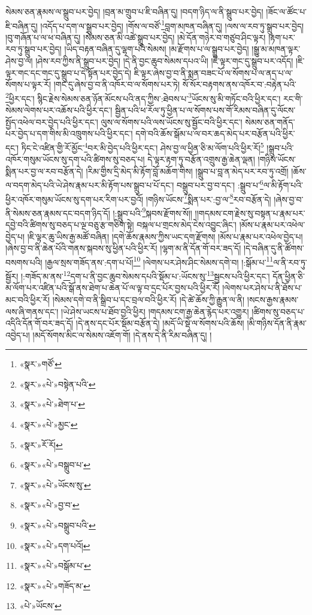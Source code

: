 སེམས་ཅན་རྣམས་ལ་སྒྲུབ་པར་བྱེད། །བྲན་མ་གྲུབ་པ་ཇི་བཞིན་དུ། །བདག་ཉིད་ལ་ནི་སྒྲུབ་པར་བྱེད། །ཟོང་ལ་ཚོང་པ་ཇི་བཞིན་དུ། །འདོད་པ་དག་ལ་སྒྲུབ་པར་བྱེད། །གོས་ལ་བཙོ་\footnote{«སྣར་»གཙོ་}བླག་མཁན་བཞིན་དུ། །ལས་ལ་རབ་ཏུ་སྒྲུབ་པར་བྱེད། །བུ་གཞོན་པ་ལ་ཕ་བཞིན་དུ། །སེམས་ཅན་མི་འཚེ་སྒྲུབ་པར་བྱེད། །མེ་དོན་གཉེར་བ་གཙུབ་ཤིང་ལྟར། །རྟག་པར་རབ་ཏུ་སྒྲུབ་པར་བྱེད། །ཡིད་བརྟན་བཞིན་དུ་ལྷག་པའི་སེམས། །མ་རྫོགས་པ་ལ་སྒྲུབ་པར་བྱེད། །སྒྱུ་མ་མཁན་ལྟར་ཤེས་བྱ་ལ། །ཤེས་རབ་ཀྱིས་ནི་སྒྲུབ་པར་བྱེད། །དེ་ནི་བྱང་ཆུབ་སེམས་དཔའ་ཡི། །ཇི་ལྟར་གང་དུ་སྒྲུབ་པར་འདོད། །ཇི་ལྟར་གང་དང་གང་དུ་སྒྲུབ་པ་དེ་སྟོན་པར་བྱེད་དེ། ཇི་ལྟར་ཞེས་བྱ་བ་ནི་སྨན་བཟང་པོ་ལ་སོགས་པ་ལ་ནད་པ་ལ་སོགས་པ་ལྟར་རོ། །གང་དུ་ཞེས་བྱ་བ་ནི་འཁོར་བ་ལ་སོགས་པར་ཏེ། སོ་སོར་བརྟགས་ནས་འཁོར་བ་:བརྟེན་པའི་\footnote{«སྣར་»«པེ་»བསྟེན་པའི་}ཕྱིར་དང་། སྙིང་རྗེས་སེམས་ཅན་ཉོན་མོངས་པའི་ནད་ཀྱིས་:ཐེབས་པ་\footnote{«སྣར་»«པེ་»ཐེག་པ་}ཡོངས་སུ་མི་གཏོང་བའི་ཕྱིར་དང་། རང་གི་སེམས་ལེགས་པར་འཆོས་པའི་ཕྱིར་དང་། སྦྱིན་པའི་ཕ་རོལ་ཏུ་ཕྱིན་པ་ལ་སོགས་པས་གོ་རིམས་བཞིན་དུ་ལོངས་སྤྱོད་འཕེལ་བར་བྱེད་པའི་ཕྱིར་དང་། ལུས་ལ་སོགས་པའི་ལས་ཡོངས་སུ་སྦྱོང་བའི་ཕྱིར་དང་། སེམས་ཅན་གནོད་པར་བྱེད་པ་དག་གིས་མི་འཁྲུགས་པའི་ཕྱིར་དང་། དགེ་བའི་ཆོས་སྒོམ་པ་ལ་བར་ཆད་མེད་པར་བརྩོན་པའི་ཕྱིར་དང་། ཏིང་ངེ་འཛིན་གྱི་རོ་མྱོང་\footnote{«སྣར་»«པེ་»མྱང་}བར་མི་བྱེད་པའི་ཕྱིར་དང་། ཤེས་བྱ་ལ་ཕྱིན་ཅི་མ་ལོག་པའི་ཕྱིར་རོ།\footnote{«སྣར་»རོ་རོ།} །སྒྲུབ་པའི་འཁོར་གསུམ་ཡོངས་སུ་དག་པའི་ཚིགས་སུ་བཅད་པ། དེ་ལྟར་རྟག་ཏུ་བརྩོན་འགྲུས་རྒྱ་ཆེན་ལྡན། །གཉིས་ཡོངས་སྨིན་པར་བྱ་ལ་རབ་བརྩོན་དེ། །རིམ་གྱིས་དྲི་མེད་མི་རྟོག་བློ་མཆོག་གིས། །སྒྲུབ་པ་བླ་ན་མེད་པར་རབ་ཏུ་འགྲོ། །ཆོས་ལ་བདག་མེད་པའི་ཡེ་ཤེས་རྣམ་པར་མི་རྟོག་པས་སྒྲུབ་པ་པོ་དང་། བསྒྲུབ་པར་བྱ་བ་དང་། :སྒྲུབ་པ་\footnote{«སྣར་»«པེ་»བསྒྲུབ་པ་}ལ་མི་རྟོག་པའི་ཕྱིར་འཁོར་གསུམ་ཡོངས་སུ་དག་པར་རིག་པར་བྱའོ། །གཉིས་ཡོངས་\footnote{«སྣར་»«པེ་»ཡོངས་སུ་}སྨིན་པར་:བྱ་ལ་\footnote{«སྣར་»«པེ་»བྱ་བ་}རབ་བརྩོན་དེ། །ཞེས་བྱ་བ་ནི་སེམས་ཅན་རྣམས་དང་བདག་ཉིད་དོ། །:སྒྲུབ་པའི་\footnote{«སྣར་»«པེ་»བསྒྲུབ་པའི་}སྐབས་རྫོགས་སོ།། །།གདམས་ངག་རྗེས་སུ་བསྟན་པ་རྣམ་པར་དབྱེ་བའི་ཚིགས་སུ་བཅད་པ་ལྔ་བཅུ་རྩ་གཅིག་སྟེ། བསྐལ་པ་གྲངས་མེད་ངེས་འབྱུང་ཞིང་། །མོས་པ་རྣམ་པར་འཕེལ་བྱེད་པ། །ཇི་ལྟར་ཆུ་ཡིས་རྒྱ་མཚོ་བཞིན། །དགེ་ཆོས་རྣམས་ཀྱིས་ཡང་དག་རྫོགས། །མོས་པ་རྣམ་པར་འཕེལ་བྱེད་པ། །ཞེས་བྱ་བ་ནི་ཆེན་པོའི་གནས་སྐབས་སུ་ཕྱིན་པའི་ཕྱིར་རོ། །ལྷག་མ་ནི་དོན་གོ་བར་ཟད་དོ། །དེ་བཞིན་དུ་ནི་ཚོགས་བསགས་པའི། །རྒྱལ་སྲས་གཟོད་ནས་:དག་པ་པོ།\footnote{«སྣར་»«པེ་»དག་པའོ།} །ལེགས་པར་ཤེས་ཤིང་སེམས་དགེ་བ། །:སྒོམ་པ་\footnote{«སྣར་»«པེ་»བསྒོམ་པ་}ལ་ནི་རབ་ཏུ་སྦྱོར། །:གཟོད་མ་ནས་\footnote{«སྣར་»«པེ་»གཟོད་མ་}དག་པ་ནི་བྱང་ཆུབ་སེམས་དཔའི་སྡོམ་པ་:ཡོངས་སུ་\footnote{«པེ་»ཡོངས་}སྦྱངས་པའི་ཕྱིར་དང་། དོན་ཕྱིན་ཅི་མ་ལོག་པར་འཛིན་པའི་སྒོ་ནས་ཐེག་པ་ཆེན་པོ་ལ་ལྟ་བ་དྲང་པོར་བྱས་པའི་ཕྱིར་རོ། །ལེགས་པར་ཤེས་པ་ནི་ཐོས་པ་མང་བའི་ཕྱིར་རོ། །སེམས་དགེ་བ་ནི་སྒྲིབ་པ་དང་བྲལ་བའི་ཕྱིར་རོ། །དེ་ཚེ་ཆོས་ཀྱི་རྒྱུན་ལ་ནི། །སངས་རྒྱས་རྣམས་ལས་ཞི་གནས་དང་། །ཡེ་ཤེས་ཡངས་པ་ཐོབ་བྱའི་ཕྱིར། །གདམས་ངག་རྒྱ་ཆེན་རྙེད་པར་འགྱུར། །ཚིགས་སུ་བཅད་པ་འདིའི་དོན་གོ་བར་ཟད་དོ། །དེ་ནས་དང་པོར་སྡོམ་བརྩོན་དེ། །མདོ་ཡི་སྡེ་ལ་སོགས་པའི་ཆོས། །མི་གཉིས་དོན་ནི་རྣམ་འབྱེད་པ། །མདོ་སོགས་མིང་ལ་སེམས་འཇོག་གོ། །དེ་ནས་དེ་ནི་རིམ་བཞིན་དུ། །
